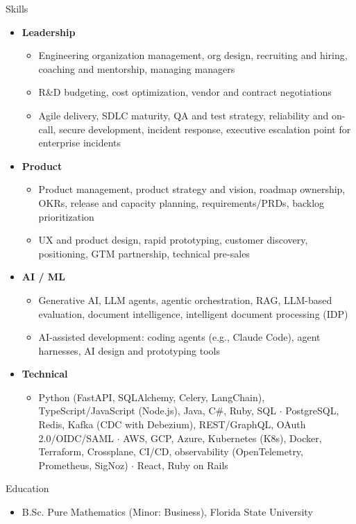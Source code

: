 \documentclass[10pt,oneside]{article}
\newenvironment{ressection}[1]{
  \vspace{4pt}
  {\fontfamily{phv}\selectfont\Large#1}
  \begin{itemize}
    \vspace{3pt}
}{
  \end{itemize}
}
\newcommand{\resitem}[1]{
  \vspace{-4pt}
\item \begin{flushleft} #1 \end{flushleft}
}
\newcommand{\ressubitem}[1]{
  \vspace{-1pt}
\item \begin{flushleft} #1 \end{flushleft}
}
\newenvironment{reslist}[1]{
  \resitem{\textbf{#1}}
  \vspace{-5pt}
  \begin{itemize}
}{
  \end{itemize}
}
\begin{document}
\begin{ressection}{Skills}
  \begin{reslist}{Leadership}
    \ressubitem{Engineering organization management, org design, recruiting and hiring, coaching and mentorship, managing managers}
    \ressubitem{R\&D budgeting, cost optimization, vendor and contract negotiations}
    \ressubitem{Agile delivery, SDLC maturity, QA and test strategy, reliability and on-call, secure development, incident response, executive escalation point for enterprise incidents}
  \end{reslist}
  \begin{reslist}{Product}
    \ressubitem{Product management, product strategy and vision, roadmap ownership, OKRs, release and capacity planning, requirements/PRDs, backlog prioritization}
    \ressubitem{UX and product design, rapid prototyping, customer discovery, positioning, GTM partnership, technical pre-sales}
  \end{reslist}
  \begin{reslist}{AI / ML}
    \ressubitem{Generative AI, LLM agents, agentic orchestration, RAG, LLM-based evaluation, document intelligence, intelligent document processing (IDP)}
    \ressubitem{AI-assisted development: coding agents (e.g., Claude Code), agent harnesses, AI design and prototyping tools}
  \end{reslist}
  \begin{reslist}{Technical}
    \ressubitem{Python (FastAPI, SQLAlchemy, Celery, LangChain), TypeScript/JavaScript (Node.js), Java, C\#, Ruby, SQL $\cdot$ PostgreSQL, Redis, Kafka (CDC with Debezium), REST/GraphQL, OAuth 2.0/OIDC/SAML $\cdot$ AWS, GCP, Azure, Kubernetes (K8s), Docker, Terraform, Crossplane, CI/CD, observability (OpenTelemetry, Prometheus, SigNoz) $\cdot$ React, Ruby on Rails}
  \end{reslist}
\end{ressection}

\begin{ressection}{Education}
  \ressubitem{B.Sc. Pure Mathematics (Minor: Business), Florida State University}
\end{ressection}
\end{document}
